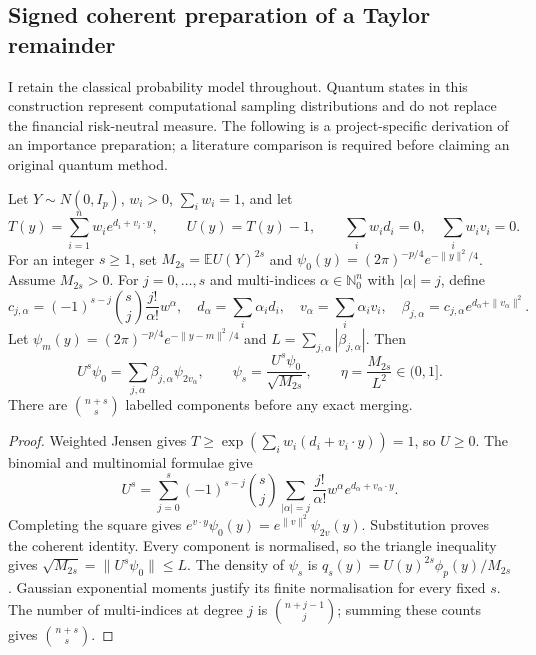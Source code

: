 \subsection{Signed coherent preparation of a Taylor remainder}
\label{sec:coherent-tilt-remainder}

I retain the classical probability model throughout. Quantum states in
this construction represent computational sampling distributions and do
not replace the financial risk-neutral measure. The following is a
project-specific derivation of an importance preparation; a literature
comparison is required before claiming an original quantum method.

\begin{proposition}
Let $Y\sim N(0,I_p)$, $w_i>0$, $\sum_iw_i=1$, and let
\[
 T(y)=\sum_{i=1}^n w_i e^{d_i+v_i\cdot y},\qquad U(y)=T(y)-1,
 \qquad\sum_iw_i d_i=0,\quad\sum_iw_i v_i=0.
\]
For an integer $s\geq1$, set $M_{2s}=\mathbb E U(Y)^{2s}$ and
$\psi_0(y)=(2\pi)^{-p/4}e^{-\|y\|^2/4}$. Assume $M_{2s}>0$.
For $j=0,\ldots,s$ and multi-indices $\alpha\in\mathbb N_0^n$
with $|\alpha|=j$, define
\[
 c_{j,\alpha}=(-1)^{s-j}\binom sj\frac{j!}{\alpha!}w^\alpha,
 \quad d_\alpha=\sum_i\alpha_i d_i,
 \quad v_\alpha=\sum_i\alpha_i v_i,
 \quad \beta_{j,\alpha}=c_{j,\alpha}e^{d_\alpha+\|v_\alpha\|^2}.
\]
Let $\psi_m(y)=(2\pi)^{-p/4}e^{-\|y-m\|^2/4}$ and
$L=\sum_{j,\alpha}|\beta_{j,\alpha}|$. Then
\[
 U^s\psi_0=\sum_{j,\alpha}\beta_{j,\alpha}\psi_{2v_\alpha},
 \qquad
 \psi_s=\frac{U^s\psi_0}{\sqrt{M_{2s}}},
 \qquad
 \eta=\frac{M_{2s}}{L^2}\in(0,1].
\]
There are $\binom{n+s}{s}$ labelled components before any exact merging.
\end{proposition}

\begin{proof}
Weighted Jensen gives $T\geq\exp(\sum_iw_i(d_i+v_i\cdot y))=1$,
so $U\geq0$. The binomial and multinomial formulae give
\[
 U^s=\sum_{j=0}^s(-1)^{s-j}\binom sj
       \sum_{|\alpha|=j}\frac{j!}{\alpha!}w^\alpha
       e^{d_\alpha+v_\alpha\cdot y}.
\]
Completing the square gives
$e^{v\cdot y}\psi_0(y)=e^{\|v\|^2}\psi_{2v}(y)$.
Substitution proves the coherent identity. Every component is normalised,
so the triangle inequality gives
$\sqrt{M_{2s}}=\|U^s\psi_0\|\leq L$. The density of $\psi_s$ is
$q_s(y)=U(y)^{2s}\phi_p(y)/M_{2s}$. Gaussian exponential moments
justify its finite normalisation for every fixed $s$. The number of
multi-indices at degree $j$ is $\binom{n+j-1}{j}$; summing these
counts gives $\binom{n+s}{s}$.
\end{proof}

